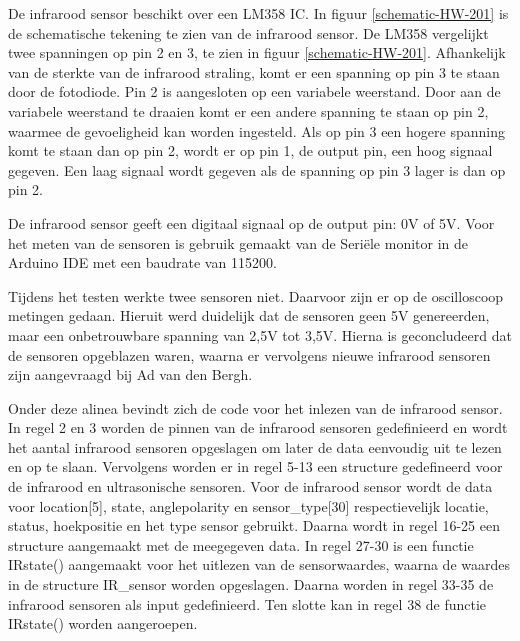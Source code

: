 De infrarood sensor beschikt over een LM358 IC\cite{LM358-datasheet}. In figuur \eqref{schematic-HW-201}\cite{HW-201-schema} is de schematische tekening te zien van de infrarood sensor. De LM358 vergelijkt twee spanningen op pin 2 en 3, te zien in figuur \eqref{schematic-HW-201}. Afhankelijk van de sterkte van de infrarood straling, komt er een spanning op pin 3 te staan door de fotodiode. Pin 2 is aangesloten op een variabele weerstand. Door aan de variabele weerstand te draaien komt er een andere spanning te staan op pin 2, waarmee de gevoeligheid kan worden ingesteld. Als op pin 3 een hogere spanning komt te staan dan op pin 2, wordt er op pin 1, de output pin, een hoog signaal gegeven. Een laag signaal wordt gegeven als de spanning op pin 3 lager is dan op pin 2.

De infrarood sensor geeft een digitaal signaal op de output pin: 0V of 5V. Voor het meten van de sensoren is gebruik gemaakt van de Seriële monitor in de Arduino IDE met een baudrate van 115200. 

Tijdens het testen werkte twee sensoren niet. Daarvoor zijn er op de oscilloscoop metingen gedaan. Hieruit werd duidelijk dat de sensoren geen 5V genereerden, maar een onbetrouwbare spanning van 2,5V tot 3,5V. Hierna is geconcludeerd dat de sensoren opgeblazen waren, waarna er vervolgens nieuwe infrarood sensoren zijn aangevraagd bij  Ad van den Bergh.

Onder deze alinea bevindt zich de code voor het inlezen van de infrarood sensor. In regel 2 en 3 worden de pinnen van de infrarood sensoren gedefinieerd en wordt het aantal infrarood sensoren opgeslagen om later de data eenvoudig uit te lezen en op te slaan. Vervolgens worden er in regel 5-13 een structure gedefineerd voor de infrarood en ultrasonische sensoren. Voor de infrarood sensor wordt de data voor location[5], state, anglepolarity en sensor\_type[30] respectievelijk locatie, status, hoekpositie en het type sensor gebruikt. Daarna wordt in regel 16-25 een structure aangemaakt met de  meegegeven data. In regel 27-30 is een functie IRstate() aangemaakt voor het uitlezen van de sensorwaardes, waarna de waardes in de structure IR\_sensor worden opgeslagen. Daarna worden in regel 33-35 de infrarood sensoren als input gedefinieerd. Ten slotte kan in regel 38 de functie IRstate() worden aangeroepen.


